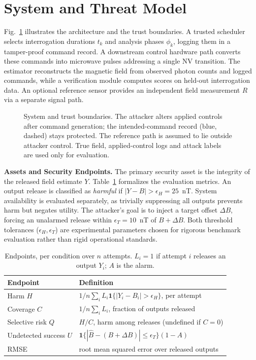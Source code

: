 \documentclass[conference]{IEEEtran}
\newcommand{\Bhat}{\widehat{B}}
\newcommand{\ind}{\mathbf{1}}
\begin{document}
\section{System and Threat Model}
\label{sec:threat}

Fig.~\ref{fig:pipeline} illustrates the architecture and the trust boundaries. A trusted scheduler selects interrogation durations $t_k$ and analysis phases $\phi_k$, logging them in a tamper-proof command record. A downstream control hardware path converts these commands into microwave pulses addressing a single NV transition. The estimator reconstructs the magnetic field from observed photon counts and logged commands, while a verification module computes scores on held-out interrogation data. An optional reference sensor provides an independent field measurement $R$ via a separate signal path.

\begin{figure}[t]
\centering

\caption{System and trust boundaries. The attacker alters applied controls after command generation; the intended-command record (blue, dashed) stays protected. The reference path is assumed to lie outside attacker control. True field, applied-control logs and attack labels are used only for evaluation.}
\label{fig:pipeline}
\end{figure}

\textbf{Assets and Security Endpoints.} The primary security asset is the integrity of the released field estimate $Y$. Table~\ref{tab:metrics} formalizes the evaluation metrics. An output release is classified as \emph{harmful} if $|Y-B| > \epsilon_H = 25$~nT. System availability is evaluated separately, as trivially suppressing all outputs prevents harm but negates utility. The attacker's goal is to inject a target offset $\Delta B$, forcing an unalarmed release within $\epsilon_T = 10$~nT of $B+\Delta B$. Both threshold tolerances ($\epsilon_H, \epsilon_T$) are experimental parameters chosen for rigorous benchmark evaluation rather than rigid operational standards.

\begin{table}[t]
\centering
\caption{Endpoints, per condition over $n$ attempts. $L_i=1$ if attempt $i$ releases an output $Y_i$; $A$ is the alarm.}
\label{tab:metrics}
\footnotesize
\begin{tabular}{@{}lp{}@{}}
\toprule
Endpoint & Definition \\
\midrule
Harm $H$ & $1/n\sum_i L_i\ind\{|Y_i-B_i|>\epsilon_H\}$, per attempt \\
Coverage $C$ & $1/n\sum_i L_i$, fraction of outputs released \\
Selective risk $Q$ & $H/C$, harm among releases (undefined if $C=0$) \\
Undetected success $U$ & $\ind\{|\Bhat-(B+\Delta B)|\le\epsilon_T\}(1-A)$ \\
RMSE & root mean squared error over released outputs \\
\bottomrule
\end{tabular}
\end{table}
\end{document}
